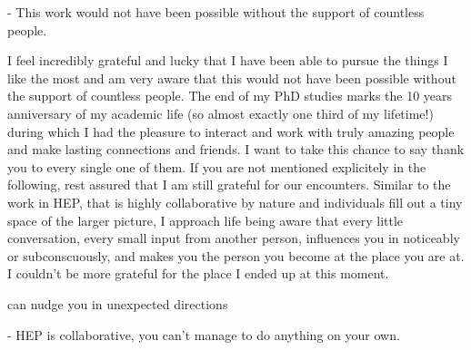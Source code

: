 - This work would not have been possible without the support of countless people.

I feel incredibly grateful and lucky that I have been able to pursue the things I like the most and am very aware that this would not have been possible without the support of countless people.
The end of my PhD studies marks the 10 years anniversary of my academic life (so almost exactly one third of my lifetime!) during which I had the pleasure to interact and work with truly amazing people and make lasting connections and friends.
I want to take this chance to say thank you to every single one of them. If you are not mentioned explicitely in the following, rest assured that I am still grateful for our encounters. Similar to the work in HEP, that is highly collaborative by nature and individuals fill out a tiny space of the larger picture, I approach life being aware that every little conversation, every small input from another person, influences you in noticeably or subconscuously, and makes you the person you become at the place you are at. I couldn't be more grateful for the place I ended up at this moment. 

can nudge you in unexpected directions 

- HEP is collaborative, you can't manage to do anything on your own.
